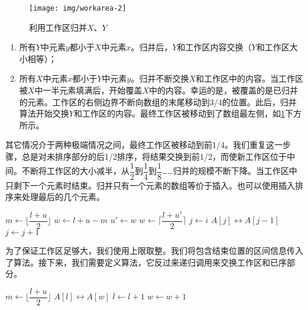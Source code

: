 \documentclass[b5paper]{ctexart}
\begin{document}
\begin{figure}[htbp]
 \centering
 \texttt{[image: img/workarea-2]}
 \caption{利用工作区归并$X$、$Y$}
 \label{fig:merge-in-place-setup}
\end{figure}

\begin{enumerate}
\item 所有$Y$中元素$y$都小于$X$中元素$x$。归并后，$Y$和工作区内容交换（$Y$和工作区大小相等）；
\item 所有$X$中元素$x$都小于$Y$中元素$y$。归并不断交换$X$和工作区中的内容。当工作区被$X$中一半元素填满后，开始覆盖$X$中的内容。幸运的是，被覆盖的是已归并的元素。工作区的右侧边界不断向数组的末尾移动到3/4的位置。此后，归并算法开始交换$Y$和工作区的内容。最终工作区被移动到了数组最左侧，如\cref{fig:merge-in-place-setup}下方所示。
\end{enumerate}

其它情况介于两种极端情况之间，最终工作区被移动到前1/4。我们重复这一步骤，总是对未排序部分的后1/2排序，将结果交换到前1/2，而使新工作区位于中间。不断将工作区的大小减半，从$\dfrac{1}{2}$到$\dfrac{1}{4}$到$\dfrac{1}{8}$……归并的规模不断下降。当工作区中只剩下一个元素时结束。归并只有一个元素的数组等价于插入。也可以使用插入排序来处理最后的几个元素。

\begin{algorithmic}[1]
    \State $m \gets \lfloor \dfrac{l + u}{2} \rfloor$
    \State $w \gets l + u - m$
    \State {} 
      \State $u' \gets w$
      \State $w \gets \lceil \dfrac{l + u'}{2} \rceil$ 
      \State {} 
      \State \Call{Merge}{$A, [l, l + u' - w), [u', u), w$}
    \EndWhile
     
      \State $j \gets i$
        \State {} $A[j] \leftrightarrow A[j-1]$
        \State $j \gets j + 1$
      \EndWhile
    \EndFor
  \EndIf
\EndProcedure
\end{algorithmic}

为了保证工作区足够大，我们使用上限取整。我们将包含结束位置的区间信息传入了算法。接下来，我们需要定义算法，它反过来递归调用来交换工作区和已序部分。

\begin{algorithmic}[1]
    \State $m \gets \lfloor \dfrac{l + u}{2} \rfloor$
    \State {}
    \State {}
    \State \Call{Merge}{$A, [l, m), [m+1, u), w$}
  \Else {}
      \State {} $A[l] \leftrightarrow A[w]$
      \State $l \gets l + 1$
      \State $w \gets w + 1$
    \EndWhile
  \EndIf
\EndProcedure
\end{algorithmic}
\end{document}
